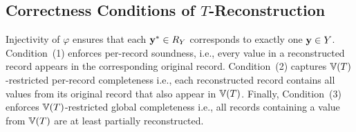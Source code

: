 \subsection{Correctness Conditions of $T$-Reconstruction}
\label{sec:correctness-TR}
Injectivity of $\varphi$ ensures that each $\mathbf{y}^* \in R_Y$ corresponds to
exactly one $\mathbf{y} \in Y$. Condition~(1) enforces per-record soundness, i.e.,
every value in a reconstructed record appears in the corresponding original
record. Condition~(2) captures $\Ispace[T]$-restricted per-record completeness
i.e., each reconstructed record contains all values from its original record
that also appear in $\Ispace[T]$. Finally, Condition~(3) enforces
$\Ispace[T]$-restricted global completeness i.e., all records containing a value
from $\Ispace[T]$ are at least partially reconstructed.
